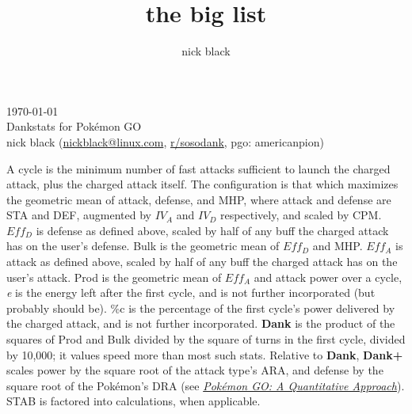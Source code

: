 \documentclass[ebook,10pt,openany,oneside]{memoir}
\title{the big list}
\author{nick black}
\begin{document}
\noindent{}\today\\
Dankstats for Pokémon GO\\
nick black (\href{mailto:nickblack@linux.com}{nickblack@linux.com}, \href{https://www.reddit.com/user/sosodank/}{r/sosodank}, pgo: americanpion)\\
\bigskip

A cycle is the minimum number of fast attacks sufficient to launch the charged attack, plus the charged attack itself.
The configuration is that which maximizes the geometric mean of attack, defense, and MHP, where attack and defense are STA and DEF, augmented by $IV_A$ and $IV_D$ respectively, and scaled by CPM.
$Eff_D$ is defense as defined above, scaled by half of any buff the charged attack has on the user's defense.
Bulk is the geometric mean of $Eff_D$ and MHP.
$Eff_A$ is attack as defined above, scaled by half of any buff the charged attack has on the user's attack.
Prod is the geometric mean of $Eff_A$ and attack power over a cycle,
\textit{e} is the energy left after the first cycle, and is not further incorporated (but probably should be).
\%c is the percentage of the first cycle's power delivered by the charged attack, and is not further incorporated.
\textbf{Dank} is the product of the squares of Prod and Bulk divided by the square of turns in the first cycle, divided by 10,000; it values speed more than most such stats.
Relative to \textbf{Dank}, \textbf{Dank+} scales power by the square root of the attack type's ARA, and defense by the square root of the Pokémon's DRA (see \textit{\href{https://nick-black.com/pgo-quantitative.pdf}{Pokémon GO: A Quantitative Approach}}).
STAB is factored into calculations, when applicable.
\bigskip

\footnotesize
\setlength{\tabcolsep}{2pt}



\end{document}
